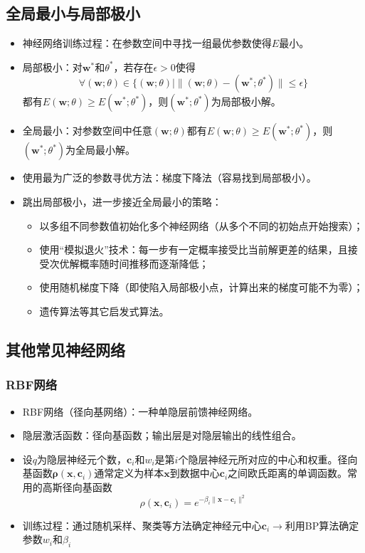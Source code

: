 \documentclass{ctexart}
\begin{document}
				\subsection{全局最小与局部极小}
					\begin{itemize}
						\item 神经网络训练过程：在参数空间中寻找一组最优参数使得$E$最小。
						\item 局部极小：对$\bm{w}^*$和$\theta^*$，若存在$\epsilon>0$使得\[\forall(\bm{w};\theta)\in\{(\bm{w};\theta)|\parallel(\bm{w};\theta)-(\bm{w}^*;\theta^*)\parallel\le\epsilon\}\]都有$E(\bm{w};\theta)\ge E(\bm{w}^*;\theta^*)$，则$(\bm{w}^*;\theta^*)$为局部极小解。
						\item 全局最小：对参数空间中任意$(\bm{w};\theta)$都有$E(\bm{w};\theta)\ge E(\bm{w}^*;\theta^*)$，则$(\bm{w}^*;\theta^*)$为全局最小解。
						\item 使用最为广泛的参数寻优方法：梯度下降法（容易找到局部极小）。
						\item 跳出局部极小，进一步接近全局最小的策略：\begin{itemize}
							\item 以多组不同参数值初始化多个神经网络（从多个不同的初始点开始搜索）；
							\item 使用``模拟退火''技术：每一步有一定概率接受比当前解更差的结果，且接受次优解概率随时间推移而逐渐降低；
							\item 使用随机梯度下降（即使陷入局部极小点，计算出来的梯度可能不为零）；
							\item 遗传算法等其它启发式算法。
						\end{itemize}
					\end{itemize}
				\subsection{其他常见神经网络}
					\subsubsection{RBF网络}
						\begin{itemize}
							\item RBF网络（径向基网络）：一种单隐层前馈神经网络。
							\item 隐层激活函数：径向基函数；输出层是对隐层输出的线性组合。
							\item 设$q$为隐层神经元个数，$\bm{c}_i$和$w_i$是第$i$个隐层神经元所对应的中心和权重。径向基函数$\bm{\rho}(\bm{x},\bm{c}_i)$通常定义为样本$\bm{x}$到数据中心$\bm{c}_i$之间欧氏距离的单调函数。常用的高斯径向基函数\[\rho(\bm{x},\bm{c}_i)=e^{-\beta_i\parallel\bm{x}-\bm{c}_i\parallel^2}\]
							\item 训练过程：通过随机采样、聚类等方法确定神经元中心$\bm{c}_i$$\rightarrow$利用BP算法确定参数$w_i$和$\beta_i$
						\end{itemize}
\end{document}
